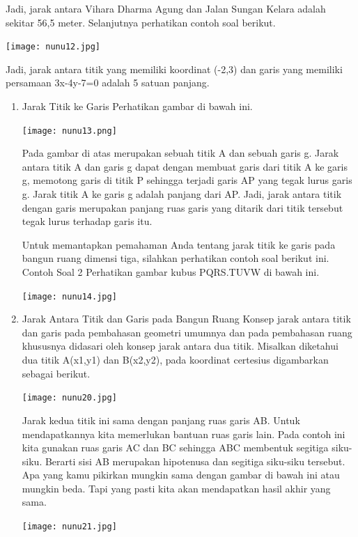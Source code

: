 \documentclass[11pt,fleqn]{book} %
\begin{document}
Jadi, jarak antara Vihara Dharma Agung dan Jalan Sungan Kelara adalah sekitar 56,5 meter. Selanjutnya perhatikan contoh soal berikut.

\texttt{[image: nunu12.jpg]}

Jadi, jarak antara titik yang memiliki koordinat (-2,3) dan garis yang memiliki persamaan 3x-4y-7=0 adalah 5 satuan panjang.

\begin{enumerate}
\item Jarak Titik ke Garis
Perhatikan gambar di bawah ini.

\begin{center}
\texttt{[image: nunu13.png]}
\end{center}

Pada gambar di atas merupakan sebuah titik A dan sebuah garis g. Jarak antara titik A dan garis g dapat dengan membuat garis dari titik A ke garis g, memotong garis di titik P sehingga terjadi garis AP yang tegak lurus garis g. Jarak titik A ke garis g adalah panjang dari AP. Jadi, jarak antara titik dengan garis merupakan panjang ruas garis yang ditarik dari titik tersebut tegak lurus terhadap garis itu.

Untuk memantapkan pemahaman Anda tentang jarak titik ke garis pada bangun ruang dimensi tiga, silahkan perhatikan contoh soal berikut ini.
Contoh Soal 2
Perhatikan gambar kubus PQRS.TUVW di bawah ini.
\begin{center}
\texttt{[image: nunu14.jpg]}
\end{center}

\item Jarak Antara Titik dan Garis pada Bangun Ruang
Konsep jarak antara titik dan garis pada pembahasan geometri umumnya dan pada pembahasan ruang khususnya didasari oleh konsep jarak antara dua titik. Misalkan diketahui dua titik A(x1,y1) dan B(x2,y2), pada koordinat certesius digambarkan sebagai berikut.

\begin{center}
\texttt{[image: nunu20.jpg]}
\end{center}

Jarak kedua titik ini sama dengan panjang ruas garis AB. Untuk mendapatkannya kita memerlukan bantuan ruas garis lain. Pada contoh ini kita gunakan ruas garis AC dan BC sehingga ABC membentuk segitiga siku-siku. Berarti sisi AB merupakan hipotenusa dan segitiga siku-siku tersebut. Apa yang kamu pikirkan mungkin sama dengan gambar di bawah ini atau mungkin beda. Tapi yang pasti kita akan mendapatkan hasil akhir yang sama.

\begin{center}
\texttt{[image: nunu21.jpg]}
\end{center}


\end{enumerate}
\end{document}
